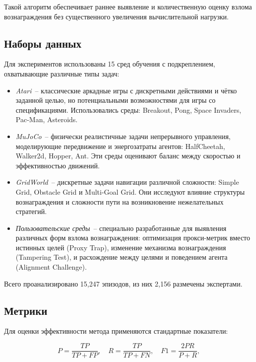 Такой алгоритм обеспечивает раннее выявление и количественную оценку взлома вознаграждения без существенного увеличения вычислительной нагрузки.


\subsection{Наборы данных}

Для экспериментов использованы 15 сред обучения с подкреплением, охватывающие различные типы задач:

\begin{itemize}
    \item \emph{Atari}~-- классические аркадные игры с дискретными действиями и чётко заданной целью, но потенциальными возможностями для игры со спецификациями. Использовались среды: Breakout, Pong, Space Invaders, Pac-Man, Asteroids.
    
    \item \emph{MuJoCo}~-- физически реалистичные задачи непрерывного управления, моделирующие передвижение и энергозатраты агентов: HalfCheetah, Walker2d, Hopper, Ant. Эти среды оценивают баланс между скоростью и эффективностью движений.
    
    \item \emph{GridWorld}~-- дискретные задачи навигации различной сложности: Simple Grid, Obstacle Grid и Multi-Goal Grid. Они исследуют влияние структуры вознаграждения и сложности пути на возникновение нежелательных стратегий.
    
    \item \emph{Пользовательские среды}~-- специально разработанные для выявления различных форм взлома вознаграждения: оптимизация прокси-метрик вместо истинных целей (Proxy Trap), изменение механизма вознаграждения (Tampering Test), и расхождение между целями и поведением агента (Alignment Challenge).
\end{itemize}

Всего проанализировано 15,247 эпизодов, из них 2,156 размечены экспертами.


\subsection{Метрики}

Для оценки эффективности метода применяются стандартные показатели:

\begin{equation}
P = \frac{TP}{TP + FP}, \quad R = \frac{TP}{TP + FN}, \quad F1 = \frac{2PR}{P + R},
\end{equation}

